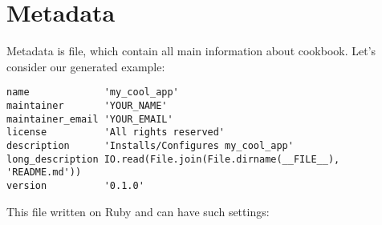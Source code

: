 \section{Metadata}
\label{sec:cookbook-metadata}

Metadata is file, which contain all main information about cookbook. Let's consider our generated example:

\begin{lstlisting}[label=lst:cookbook-metadata1,title=my-server-cloud/site-cookbooks/my\_cool\_app/metadata.rb]
name             'my_cool_app'
maintainer       'YOUR_NAME'
maintainer_email 'YOUR_EMAIL'
license          'All rights reserved'
description      'Installs/Configures my_cool_app'
long_description IO.read(File.join(File.dirname(__FILE__), 'README.md'))
version          '0.1.0'
\end{lstlisting}

This file written on Ruby and can have such settings:

